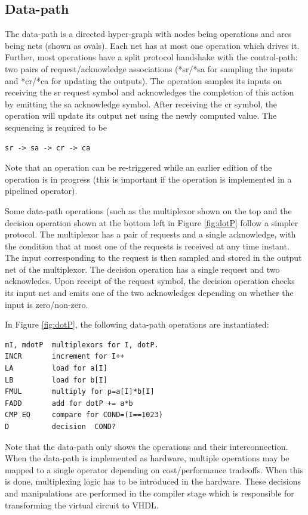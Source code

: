 \documentclass[conference]{IEEEtran}
\begin{document}
\subsection{Data-path}
The data-path is a directed hyper-graph with nodes being
operations and arcs being nets (shown as ovals).  Each
net has at most one operation which drives it.  Further, most
operations have  a split protocol handshake with
the control-path:  two pairs of request/acknowledge 
associations (*sr/*sa for sampling the inputs  and *cr/*ca for
updating the outputs).    The operation samples its inputs
on receiving the sr request symbol and acknowledges the completion
of this action by emitting the sa acknowledge symbol.  After receiving
the cr symbol, the operation will update its output net
using the newly computed value. The sequencing is required to be
\begin{verbatim}
sr -> sa -> cr -> ca
\end{verbatim}
Note that an operation can be re-triggered while an earlier
edition of the operation
is in progress (this is important if the operation is implemented
in a pipelined operator).

Some data-path operations (such as the multiplexor
shown on the top and the decision operation shown at the bottom
left in Figure \ref{fig:dotP} follow a simpler protocol.  The multiplexor
has a pair of requests and a single acknowledge, with the condition
that at most one of the requests is received at any time instant.
The input corresponding to the request is then sampled and stored
in the output net of the multiplexor.
The decision operation has a single request and two acknowledes.  Upon
receipt of the request symbol, the decision operation checks its input net
and emits one of the two acknowledges depending on whether the input
is zero/non-zero.

In Figure \ref{fig:dotP}, the following data-path operations
are instantiated:
\begin{verbatim}
mI, mdotP  multiplexors for I, dotP.
INCR       increment for I++
LA         load for a[I]
LB         load for b[I]
FMUL       multiply for p=a[I]*b[I]
FADD       add for dotP += a*b
CMP EQ     compare for COND=(I==1023)
D          decision  COND?
\end{verbatim}

Note that the data-path only shows the operations and their interconnection.
When the data-path is implemented as hardware, multiple operations may
be mapped to a single operator depending on cost/performance tradeoffs.  When
this is done, multiplexing logic has to be introduced in the hardware.  These
decisions and manipulations are performed in the compiler stage which is
responsible for transforming the virtual circuit to VHDL.
\end{document}
